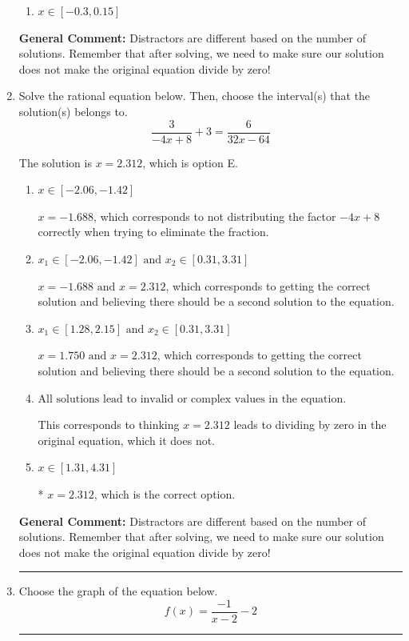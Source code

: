 \documentclass{extbook}[14pt]
\newcommand{\litem}[1]{\item #1

\rule{\textwidth}{0.4pt}}
\begin{document}
\begin{enumerate}
{\begin{enumerate}[label=\Alph*.]
\item \( x \in [-0.3,0.15] \)


\end{enumerate}

\textbf{General Comment:} Distractors are different based on the number of solutions. Remember that after solving, we need to make sure our solution does not make the original equation divide by zero!
}
\litem{
Solve the rational equation below. Then, choose the interval(s) that the solution(s) belongs to.
\[ \frac{3}{-4x + 8} + 3 = \frac{6}{32x -64} \]

The solution is \( x = 2.312 \), which is option E.\begin{enumerate}[label=\Alph*.]
\item \( x \in [-2.06,-1.42] \)

$x = -1.688$, which corresponds to not distributing the factor $-4x + 8$ correctly when trying to eliminate the fraction.
\item \( x_1 \in [-2.06, -1.42] \text{ and } x_2 \in [0.31,3.31] \)

$x = -1.688 \text{ and } x = 2.312$, which corresponds to getting the correct solution and believing there should be a second solution to the equation.
\item \( x_1 \in [1.28, 2.15] \text{ and } x_2 \in [0.31,3.31] \)

$x = 1.750 \text{ and } x = 2.312$, which corresponds to getting the correct solution and believing there should be a second solution to the equation.
\item \( \text{All solutions lead to invalid or complex values in the equation.} \)

This corresponds to thinking $x = 2.312$ leads to dividing by zero in the original equation, which it does not.
\item \( x \in [1.31,4.31] \)

* $x = 2.312$, which is the correct option.
\end{enumerate}

\textbf{General Comment:} Distractors are different based on the number of solutions. Remember that after solving, we need to make sure our solution does not make the original equation divide by zero!
}
\litem{
Choose the graph of the equation below.
\[ f(x) = \frac{-1}{x - 2} - 2 \]

}
\end{enumerate}
\end{document}
